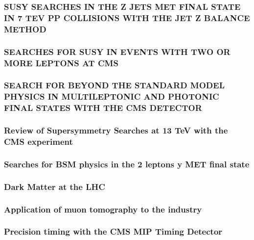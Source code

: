 \documentclass[a4paper, 11pt, twoside, openright]{report}
\begin{document}
\subsubsection{SUSY SEARCHES IN THE Z JETS MET FINAL STATE IN 7 TEV PP COLLISIONS WITH THE JET Z BALANCE METHOD}

\subsubsection{SEARCHES FOR SUSY IN EVENTS WITH TWO OR MORE LEPTONS AT CMS}

\subsubsection{SEARCH FOR BEYOND THE STANDARD MODEL PHYSICS IN MULTILEPTONIC AND PHOTONIC FINAL STATES WITH THE CMS DETECTOR}

\subsubsection{Review of Supersymmetry Searches at 13 TeV with the CMS experiment}

\subsubsection{Searches for BSM physics in the 2 leptons y MET final state}

\subsubsection{Dark Matter at the LHC}

\subsubsection{Application of muon tomography to the industry}

\subsubsection{Precision timing with the CMS MIP Timing Detector}

\end{document}
